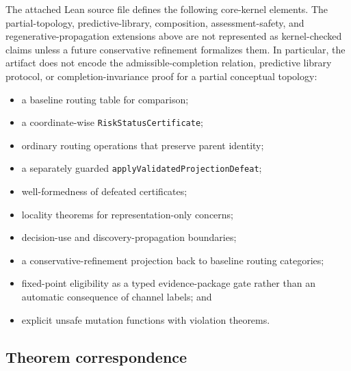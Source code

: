 \documentclass[10pt]{article}
\begin{document}
The attached Lean source file defines the following core-kernel elements. The partial-topology, predictive-library, composition, assessment-safety, and regenerative-propagation extensions above are not represented as kernel-checked claims unless a future conservative refinement formalizes them. In particular, the artifact does not encode the admissible-completion relation, predictive library protocol, or completion-invariance proof for a partial conceptual topology:
\begin{itemize}
\item a baseline routing table for comparison;
\item a coordinate-wise \texttt{RiskStatusCertificate};
\item ordinary routing operations that preserve parent identity;
\item a separately guarded \texttt{applyValidatedProjectionDefeat};
\item well-formedness of defeated certificates;
\item locality theorems for representation-only concerns;
\item decision-use and discovery-propagation boundaries;
\item a conservative-refinement projection back to baseline routing categories;
\item fixed-point eligibility as a typed evidence-package gate rather than an automatic consequence of channel labels; and
\item explicit unsafe mutation functions with violation theorems.
\end{itemize}

\subsection{Theorem correspondence}
\end{document}
